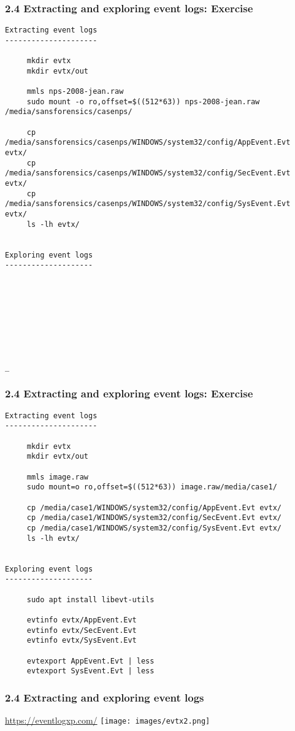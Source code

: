 \begin{frame}[fragile]
  \frametitle{2.4 Extracting and exploring event logs: Exercise}
  \begin{lstlisting}[basicstyle=\tiny]
Extracting event logs
---------------------

     mkdir evtx
     mkdir evtx/out

     mmls nps-2008-jean.raw
     sudo mount -o ro,offset=$((512*63)) nps-2008-jean.raw /media/sansforensics/casenps/

     cp /media/sansforensics/casenps/WINDOWS/system32/config/AppEvent.Evt evtx/
     cp /media/sansforensics/casenps/WINDOWS/system32/config/SecEvent.Evt evtx/
     cp /media/sansforensics/casenps/WINDOWS/system32/config/SysEvent.Evt evtx/
     ls -lh evtx/


Exploring event logs
--------------------









_
  \end{lstlisting}
\end{frame}


\begin{frame}[fragile]
  \frametitle{2.4 Extracting and exploring event logs: Exercise}
  \begin{lstlisting}[basicstyle=\tiny]
Extracting event logs
---------------------

     mkdir evtx
     mkdir evtx/out

     mmls image.raw
     sudo mount=o ro,offset=$((512*63)) image.raw/media/case1/

     cp /media/case1/WINDOWS/system32/config/AppEvent.Evt evtx/
     cp /media/case1/WINDOWS/system32/config/SecEvent.Evt evtx/
     cp /media/case1/WINDOWS/system32/config/SysEvent.Evt evtx/
     ls -lh evtx/


Exploring event logs
--------------------

     sudo apt install libevt-utils

     evtinfo evtx/AppEvent.Evt
     evtinfo evtx/SecEvent.Evt
     evtinfo evtx/SysEvent.Evt

     evtexport AppEvent.Evt | less
     evtexport SysEvent.Evt | less
  \end{lstlisting}
\end{frame}


\begin{frame}[fragile]
  \frametitle{2.4 Extracting and exploring event logs}
	\url{https://eventlogxp.com/}
    \texttt{[image: images/evtx2.png]}
\end{frame}


